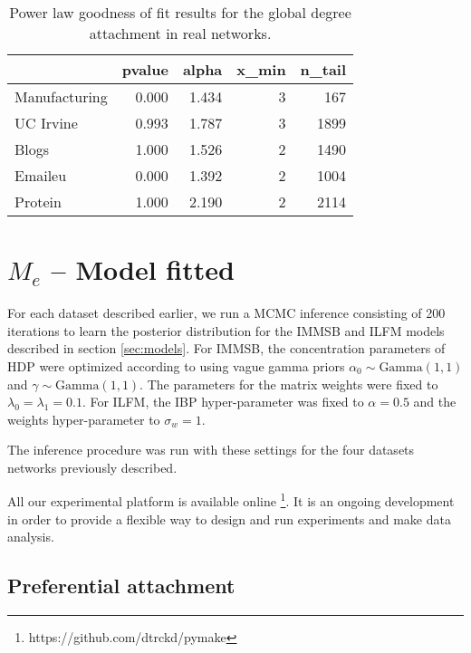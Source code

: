 \documentclass[a4paper, 12pt]{article}
\newcommand*{\lpath}{../}%
\begin{document}


\begin{table}
\caption{Power law goodness of fit results for the global degree attachment in real networks.}
\centering
\begin{tabular}{lrrrr}
	\hline
	&   pvalue &   alpha &   x\_min &   n\_tail \\
	\hline
	Manufacturing &    0.000 &   1.434 &       3 &      167 \\
	UC Irvine     &    0.993 &   1.787 &       3 &     1899 \\
	Blogs         &    1.000 &   1.526 &       2 &     1490 \\
	Emaileu       &    0.000 &   1.392 &       2 &     1004 \\
	Protein       &    1.000 &   2.190 &       2 &     2114 \\
	\hline
\end{tabular}

\label{table:real_graph}
\end{table}



\section{$M_e$ -- Model fitted}

For each dataset described earlier, we run a MCMC inference consisting of 200 iterations to learn the posterior distribution for the IMMSB and ILFM  models described in section \ref{sec:models}. For IMMSB, the concentration parameters of HDP were optimized according to  \cite{HDP} using vague gamma priors $\alpha_0 \sim \text{Gamma}(1,1)$ and $\gamma \sim \text{Gamma}(1,1)$. The parameters for the matrix weights were fixed to $\lambda_0=\lambda_1=0.1$. For ILFM, the IBP hyper-parameter was fixed to $\alpha=0.5$ and the weights hyper-parameter to $\sigma_w = 1$. 

The inference procedure was run with these settings for the four datasets networks previously described.

All our experimental platform is available online \footnote{https://github.com/dtrckd/pymake}. It is an ongoing development in order to provide a flexible way to design and run experiments and make data analysis.

\subsection{Preferential attachment}
\end{document}
